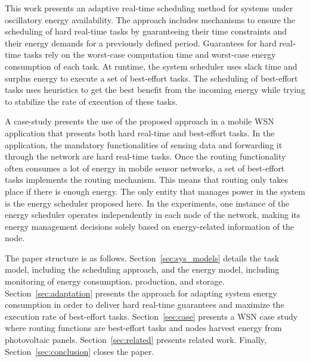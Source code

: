 This work presents an adaptive real-time scheduling method for systems under oscillatory energy availability.
The approach includes mechanisms to ensure the scheduling of hard real-time tasks by  guaranteeing their time constraints and their energy demands for a previously defined period.
Guarantees for hard real-time tasks rely on the worst-case computation time and worst-case energy consumption of each task.
At runtime, the system scheduler uses slack time and surplus energy to execute a set of best-effort tasks.
The scheduling of best-effort tasks uses heuristics to get the best benefit from the incoming energy while trying to stabilize the rate of execution of these tasks.

A case-study presents the use of the proposed approach in a mobile WSN application that presents both hard real-time and best-effort tasks.
In the application, the mandatory functionalities of sensing data and forwarding it through the network are hard real-time tasks.
Once the routing functionality often consumes a lot of energy in mobile sensor networks, a set of best-effort tasks implements the routing mechanism.
This means that routing only takes place if there is enough energy.
The only entity that manages power in the system is the energy scheduler proposed here.
In the experiments, one instance of the energy scheduler operates independently in each node of the network, making its energy management decisions solely based on energy-related information of the node.

The paper structure is as follows.
Section~\ref{sec:sys_models} details the task model, including the scheduling approach, and the energy model, including monitoring of energy consumption, production, and storage.
Section~\ref{sec:adaptation} presents the approach for adapting system energy consumption in order to deliver hard real-time guarantees and maximize the execution rate of best-effort tasks.
Section~\ref{sec:case} presents a WSN case study where routing functions are best-effort tasks and nodes harvest energy from photovoltaic panels.
Section~\ref{sec:related} presents related work.
Finally, Section~\ref{sec:conclusion} closes the paper.



